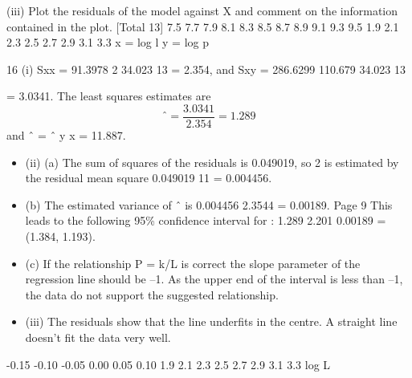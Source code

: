 \documentclass[a4paper,12pt]{article}
\begin{document}

(iii) Plot the residuals of the model against X and comment on the
information contained in the plot. 
[Total 13]
7.5
7.7
7.9
8.1
8.3
8.5
8.7
8.9
9.1
9.3
9.5
1.9 2.1 2.3 2.5 2.7 2.9 3.1 3.3
x = log l
y = log p

\newpage

16 (i) Sxx = 91.3978 
2 34.023
13
= 2.354, and
Sxy = 286.6299 
110.679 34.023
13

= 3.0341.
The least squares estimates are \[ˆ =
\frac{3.0341}{2.354}= 1.289\] and
ˆ
= ˆ
y  x = 11.887.
\begin{itemize}
    \item (ii) (a) The sum of squares of the residuals is 0.049019, so 2 is estimated
by the residual mean square 0.049019
11 = 0.004456.
\item (b) The estimated variance of ˆ is 0.004456
2.3544 = 0.00189.
Page 9
This leads to the following 95\% confidence interval for :
1.289  2.201 0.00189 = (1.384, 1.193).
\item (c) If the relationship P = k/L is correct the slope parameter of the
regression line should be –1. As the upper end of the interval is
less than –1, the data do not support the suggested relationship.
\item (iii)
The residuals show that the line underfits in the centre. A straight line
doesn’t fit the data very well.
\end{itemize}
-0.15
-0.10
-0.05
0.00
0.05
0.10
1.9 2.1 2.3 2.5 2.7 2.9 3.1 3.3
log L
\end{document}
